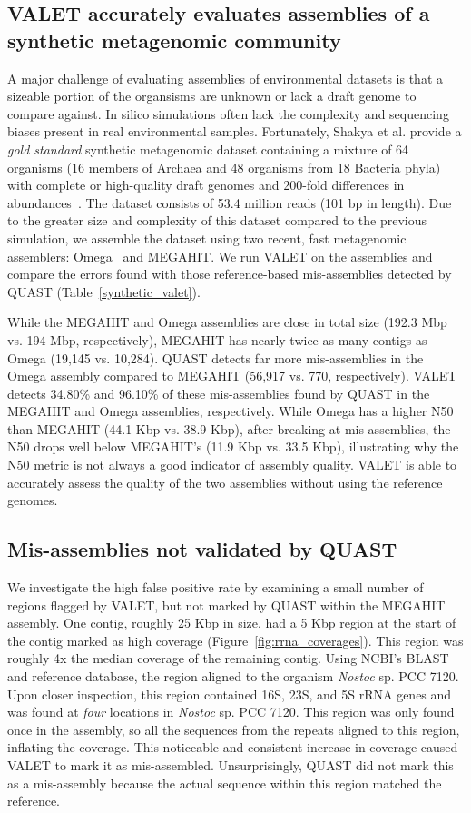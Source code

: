 \documentclass{article}
\begin{document}
\subsection{VALET accurately evaluates assemblies of a synthetic metagenomic community}

A major challenge of evaluating assemblies of environmental datasets is that a sizeable portion of the organsisms are unknown or lack a draft genome to compare against.
In silico simulations often lack the complexity and sequencing biases present in real environmental samples.
Fortunately, Shakya et al. provide a \emph{gold standard} synthetic metagenomic dataset containing a mixture of 64 organisms (16 members of Archaea and 48 organisms from 18 Bacteria phyla) with complete or high-quality draft genomes and 200-fold differences in abundances~\citep{shakya2013comparative}.
The dataset consists of 53.4 million reads (101 bp in length).
Due to the greater size and complexity of this dataset compared to the previous simulation, we assemble the dataset using two recent, fast metagenomic assemblers: Omega~\citep{haider2014omega} and MEGAHIT\citep{li2015megahit}.
We run VALET on the assemblies and compare the errors found with those reference-based mis-assemblies detected by QUAST (Table~\ref{synthetic_valet}).


While the MEGAHIT and Omega assemblies are close in total size (192.3 Mbp vs. 194 Mbp, respectively), MEGAHIT has nearly twice as many contigs as Omega (19,145 vs. 10,284).
QUAST detects far more mis-assemblies in the Omega assembly compared to MEGAHIT (56,917 vs. 770, respectively).
VALET detects 34.80\% and 96.10\% of these mis-assemblies found by QUAST in the MEGAHIT and Omega assemblies, respectively.
While Omega has a higher N50 than MEGAHIT (44.1 Kbp vs. 38.9 Kbp), after breaking at mis-assemblies, the N50 drops well below MEGAHIT's (11.9 Kbp vs. 33.5 Kbp), illustrating why the N50 metric is not always a good indicator of assembly quality.
VALET is able to accurately assess the quality of the two assemblies without using the reference genomes.

\subsection{Mis-assemblies not validated by QUAST}
We investigate the high false positive rate by examining a small number of regions flagged by VALET, but not marked by QUAST within the MEGAHIT assembly.
One contig, roughly 25 Kbp in size, had a 5 Kbp region at the start of the contig marked as high coverage (Figure~\ref{fig:rrna_coverages}).
This region was roughly 4x the median coverage of the remaining contig.
Using NCBI's BLAST~\citep{blast} and reference database, the region aligned to the organism \emph{Nostoc} sp. PCC 7120.
Upon closer inspection, this region contained 16S, 23S, and 5S rRNA genes and was found at \emph{four} locations in \emph{Nostoc} sp. PCC 7120.
This region was only found once in the assembly, so all the sequences from the repeats aligned to this region, inflating the coverage.
This noticeable and consistent increase in coverage caused VALET to mark it as mis-assembled.
Unsurprisingly, QUAST did not mark this as a mis-assembly because the actual sequence within this region matched the reference.
\end{document}
